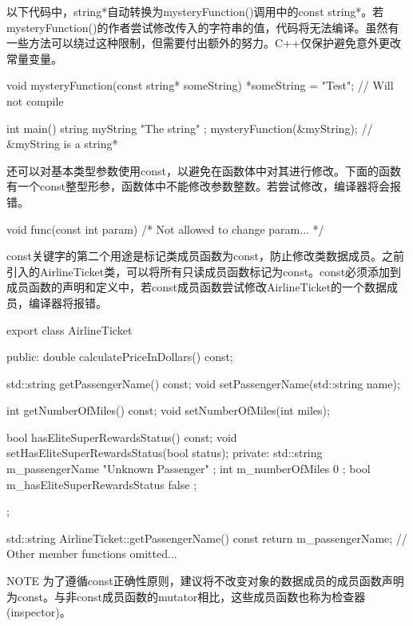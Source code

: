 以下代码中，string*自动转换为mysteryFunction()调用中的const string*。若mysteryFunction()的作者尝试修改传入的字符串的值，代码将无法编译。虽然有一些方法可以绕过这种限制，但需要付出额外的努力。C++仅保护避免意外更改常量变量。


\begin{cpp}
void mysteryFunction(const string* someString)
{
    *someString = "Test"; // Will not compile
}

int main()
{
    string myString { "The string" };
    mysteryFunction(&myString); // &myString is a string*
}
\end{cpp}

还可以对基本类型参数使用const，以避免在函数体中对其进行修改。下面的函数有一个const整型形参，函数体中不能修改参数整数。若尝试修改，编译器将会报错。

\begin{cpp}
void func(const int param) { /* Not allowed to change param... */ }
\end{cpp}


const关键字的第二个用途是标记类成员函数为const，防止修改类数据成员。之前引入的AirlineTicket类，可以将所有只读成员函数标记为const。const必须添加到成员函数的声明和定义中，若const成员函数尝试修改AirlineTicket的一个数据成员，编译器将报错。

\begin{cpp}
export class AirlineTicket
{
    public:
        double calculatePriceInDollars() const;

        std::string getPassengerName() const;
        void setPassengerName(std::string name);

        int getNumberOfMiles() const;
        void setNumberOfMiles(int miles);

        bool hasEliteSuperRewardsStatus() const;
        void setHasEliteSuperRewardsStatus(bool status);
    private:
        std::string m_passengerName { "Unknown Passenger" };
        int m_numberOfMiles { 0 };
        bool m_hasEliteSuperRewardsStatus { false };
};

std::string AirlineTicket::getPassengerName() const
{
    return m_passengerName;
}
// Other member functions omitted...
\end{cpp}

\begin{myNotic}{NOTE}
为了遵循const正确性原则，建议将不改变对象的数据成员的成员函数声明为const。与非const成员函数的mutator相比，这些成员函数也称为检查器(inspector)。
\end{myNotic}

